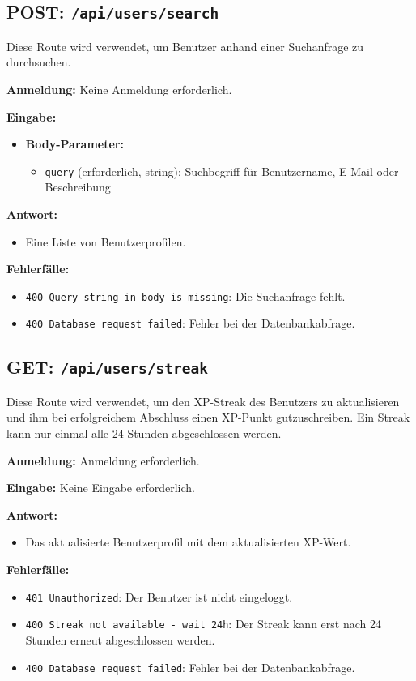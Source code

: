 \documentclass[a4paper,12pt]{article}
\begin{document}
\newpage
\subsection{POST: \texttt{/api/users/search}}

Diese Route wird verwendet, um Benutzer anhand einer Suchanfrage zu durchsuchen.

\textbf{Anmeldung:} Keine Anmeldung erforderlich.

\textbf{Eingabe:}
\begin{itemize}
    \item \textbf{Body-Parameter:}
    \begin{itemize}
        \item \texttt{query} (erforderlich, string): Suchbegriff für Benutzername, E-Mail oder Beschreibung
    \end{itemize}
\end{itemize}

\textbf{Antwort:}
\begin{itemize}
    \item Eine Liste von Benutzerprofilen.
\end{itemize}

\textbf{Fehlerfälle:}
\begin{itemize}
    \item \texttt{400 Query string in body is missing}: Die Suchanfrage fehlt.
    \item \texttt{400 Database request failed}: Fehler bei der Datenbankabfrage.
\end{itemize}

\subsection{GET: \texttt{/api/users/streak}}

Diese Route wird verwendet, um den XP-Streak des Benutzers zu aktualisieren und ihm bei erfolgreichem Abschluss einen XP-Punkt gutzuschreiben. Ein Streak kann nur einmal alle 24 Stunden abgeschlossen werden.

\textbf{Anmeldung:} Anmeldung erforderlich.

\textbf{Eingabe:} Keine Eingabe erforderlich.

\textbf{Antwort:}
\begin{itemize}
    \item Das aktualisierte Benutzerprofil mit dem aktualisierten XP-Wert.
\end{itemize}

\textbf{Fehlerfälle:}
\begin{itemize}
    \item \texttt{401 Unauthorized}: Der Benutzer ist nicht eingeloggt.
    \item \texttt{400 Streak not available - wait 24h}: Der Streak kann erst nach 24 Stunden erneut abgeschlossen werden.
    \item \texttt{400 Database request failed}: Fehler bei der Datenbankabfrage.
\end{itemize}
\end{document}
